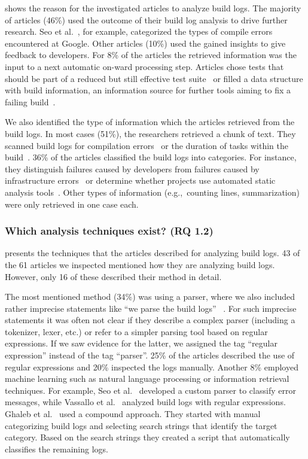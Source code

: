  shows the reason for the
investigated articles to analyze build logs.
The majority of articles (46\%) used the outcome of their build log
analysis to drive further research.
Seo et al.~\cite{seo2014programmers}, for example,
categorized the types of compile errors encountered at
Google.
Other articles (10\%) used the gained insights to give feedback to
developers.
For 8\% of the articles the retrieved information was the input
to a next automatic on-ward processing step.
Articles chose
tests that should be part of a reduced but still effective test
suite~\cite{shi2018evaluating} or filled a data structure with
build information, an information source for further tools aiming
to fix a failing build~\cite{vassallo2018un-break}.

We also identified the type of information which the articles
retrieved from the build logs.
In most cases (51\%), the researchers retrieved a chunk of text.
They scanned build logs for compilation
errors~\cite{clemencic2014new} or
the duration of tasks within the build~\cite{zhang2016android}.
36\% of the articles classified the build logs into categories.
For instance, they distinguish failures caused by developers from
failures caused
by infrastructure errors~\cite{lindqvist2019detection} or
determine whether projects use automated static analysis
tools~\cite{kavaler2019tool}.
Other types of information (e.g.,\ counting
lines, summarization) were only retrieved
in one case each.

\subsubsection{Which analysis techniques exist? (RQ 1.2)}
 presents the techniques that the articles
described for analyzing build logs.
43 of the 61 articles we inspected mentioned how they are analyzing
build logs.
However, only 16 of these described their method in detail.

The most mentioned method (34\%) was using a parser, where we also
included
rather imprecise statements like ``we parse the build logs''
~\cite{rahman2018impact}.
For such imprecise statements it was often not clear if they describe
a complex parser (including a tokenizer, lexer, etc.) or refer to a
simpler parsing tool based on regular expressions.
If we saw evidence for the latter, we assigned the tag
``regular expression'' instead of the tag ``parser''.
25\% of the articles described the use of regular expressions and 20\%
inspected the logs manually.
Another 8\% employed machine learning such as natural language
processing or information retrieval techniques.
For example,
Seo et al.~\cite{seo2014programmers} developed a custom
parser to classify error messages, while Vassallo et
al.~\cite{vassallo2017a-tale} analyzed build logs with regular
expressions.
Ghaleb et al.~\cite{ghaleb2019studying} used a compound approach.
They started with manual categorizing build logs and selecting
search strings that identify the target category.
Based on the search strings they created a script that automatically
classifies the remaining logs.

